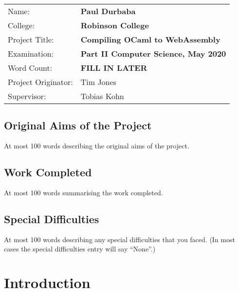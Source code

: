 \documentclass[12pt,twoside,notitlepage]{report}
\begin{document}
{\large
	\begin{tabular}{ll}
		Name:               & \bf Paul Durbaba                       \\
		College:            & \bf Robinson College                     \\
		Project Title:      & \bf Compiling OCaml to WebAssembly \\
		Examination:        & \bf Part II Computer Science, May 2020        \\
		Word Count:         & \bf FILL IN LATER  \\
		Project Originator: & Tim Jones                \\
		Supervisor:         & Tobias Kohn            \\ 
	\end{tabular}
}


\section*{Original Aims of the Project}

At most 100 words describing the original aims of the project. 


\section*{Work Completed}

At most 100 words summarising the work completed. 

\section*{Special Difficulties}

At most 100 words describing any special difficulties that you faced.
(In most cases the special difficulties entry will say “None”.) 

\tableofcontents

\listoffigures


\clearpage        %

\setcounter{page}{1}
\pagestyle{headings}

\chapter{Introduction}
\end{document}
